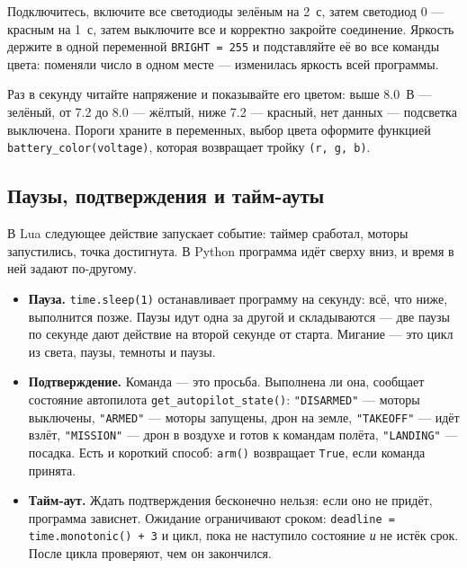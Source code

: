 \begin{taskbox}
Подключитесь, включите все светодиоды зелёным на 2~с, затем светодиод 0 --- красным на 1~с, затем выключите все и корректно закройте соединение. Яркость держите в одной переменной \verb|BRIGHT = 255| и подставляйте её во все команды цвета: поменяли число в одном месте --- изменилась яркость всей программы.
\end{taskbox}

\begin{taskbox}
Раз в секунду читайте напряжение и показывайте его цветом: выше 8.0~В --- зелёный, от 7.2 до 8.0 --- жёлтый, ниже 7.2 --- красный, нет данных --- подсветка выключена. Пороги храните в переменных, выбор цвета оформите функцией \verb|battery_color(voltage)|, которая возвращает тройку \verb|(r, g, b)|.
\end{taskbox}

\subsection{Паузы, подтверждения и тайм-ауты}
\label{sec:python-wait}

В Lua следующее действие запускает событие: таймер сработал, моторы запустились, точка достигнута. В Python программа идёт сверху вниз, и время в ней задают по-другому.
\begin{itemize}
    \item \textbf{Пауза.} \verb|time.sleep(1)| останавливает программу на секунду: всё, что ниже, выполнится позже. Паузы идут одна за другой и складываются --- две паузы по секунде дают действие на второй секунде от старта. Мигание --- это цикл из света, паузы, темноты и паузы.
    \item \textbf{Подтверждение.} Команда --- это просьба. Выполнена ли она, сообщает состояние автопилота \verb|get_autopilot_state()|: \verb|"DISARMED"| --- моторы выключены, \verb|"ARMED"| --- моторы запущены, дрон на земле, \verb|"TAKEOFF"| --- идёт взлёт, \verb|"MISSION"| --- дрон в воздухе и готов к командам полёта, \verb|"LANDING"| --- посадка. Есть и короткий способ: \verb|arm()| возвращает \verb|True|, если команда принята.
    \item \textbf{Тайм-аут.} Ждать подтверждения бесконечно нельзя: если оно не придёт, программа зависнет. Ожидание ограничивают сроком: \verb|deadline = time.monotonic() + 3| и цикл, пока не наступило состояние \emph{и} не истёк срок. После цикла проверяют, чем он закончился.
\end{itemize}

